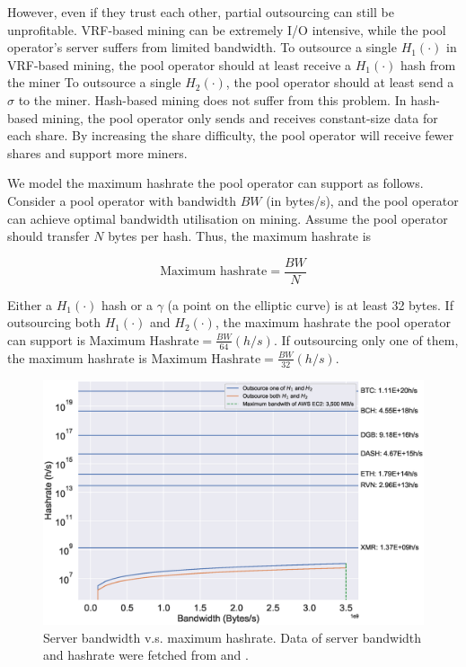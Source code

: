 However, even if they trust each other, partial outsourcing can still be unprofitable.
VRF-based mining can be extremely I/O intensive, while the pool operator's server suffers from limited bandwidth.
To outsource a single $H_1(\cdot)$ in VRF-based mining, the pool operator should at least receive a $H_1(\cdot)$ hash from the miner
To outsource a single $H_2(\cdot)$, the pool operator should at least send a $\sigma$ to the miner.
Hash-based mining does not suffer from this problem.
In hash-based mining, the pool operator only sends and receives constant-size data for each share.
By increasing the share difficulty, the pool operator will receive fewer shares and support more miners.

We model the maximum hashrate the pool operator can support as follows.
Consider a pool operator with bandwidth $BW$ (in bytes/s), and the pool operator can achieve optimal bandwidth utilisation on mining.
Assume the pool operator should transfer $N$ bytes per hash.
Thus, the maximum hashrate is

$$\text{Maximum hashrate} = \frac{BW}{N}$$

Either a $H_1(\cdot)$ hash or a $\gamma$ (a point on the elliptic curve) is at least 32 bytes.
If outsourcing both $H_1(\cdot)$ and $H_2(\cdot)$, the maximum hashrate the pool operator can support is $\text{Maximum Hashrate} = \frac{BW}{64} (h/s)$.
If outsourcing only one of them, the maximum hashrate is $\text{Maximum Hashrate} = \frac{BW}{32} (h/s)$.

\begin{figure}[htp]
    \centering
    \includegraphics[width=\linewidth]{figs/max-hashrate.eps}
    \caption{Server bandwidth v.s. maximum hashrate.
    Data of server bandwidth and hashrate were fetched from \cite{aws} and \cite{coinwarz}.}
    \label{fig:max-hashrate}
\end{figure}

